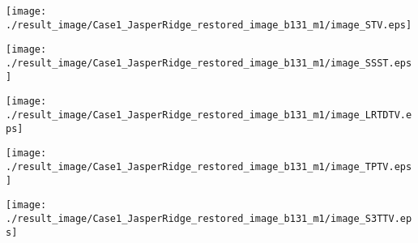 \begin{figure*}[t]
\begin{center}
        \begin{minipage}{0.150\hsize}
            \centerline{\hspace{\hsize}} %
		\end{minipage}
        \begin{minipage}{0.150\hsize}
            \centerline{\texttt{[image: ./result\_image/Case1\_JasperRidge\_restored\_image\_b131\_m1/image\_STV.eps]}} %
        \end{minipage}
        \begin{minipage}{0.150\hsize}
            \centerline{\texttt{[image: ./result\_image/Case1\_JasperRidge\_restored\_image\_b131\_m1/image\_SSST.eps]}} %
        \end{minipage}
        \begin{minipage}{0.150\hsize}
            \centerline{\texttt{[image: ./result\_image/Case1\_JasperRidge\_restored\_image\_b131\_m1/image\_LRTDTV.eps]}} %
        \end{minipage}
        \begin{minipage}{0.150\hsize}
            \centerline{\texttt{[image: ./result\_image/Case1\_JasperRidge\_restored\_image\_b131\_m1/image\_TPTV.eps]}} %
        \end{minipage}
        \begin{minipage}{0.150\hsize}
            \centerline{\texttt{[image: ./result\_image/Case1\_JasperRidge\_restored\_image\_b131\_m1/image\_S3TTV.eps]}} %
        \end{minipage}
        \begin{minipage}{0.055\hsize}
            \centerline{\hspace{\hsize}} %
		\end{minipage}
        
        \vspace{1mm}


\end{center}
\end{figure*}
